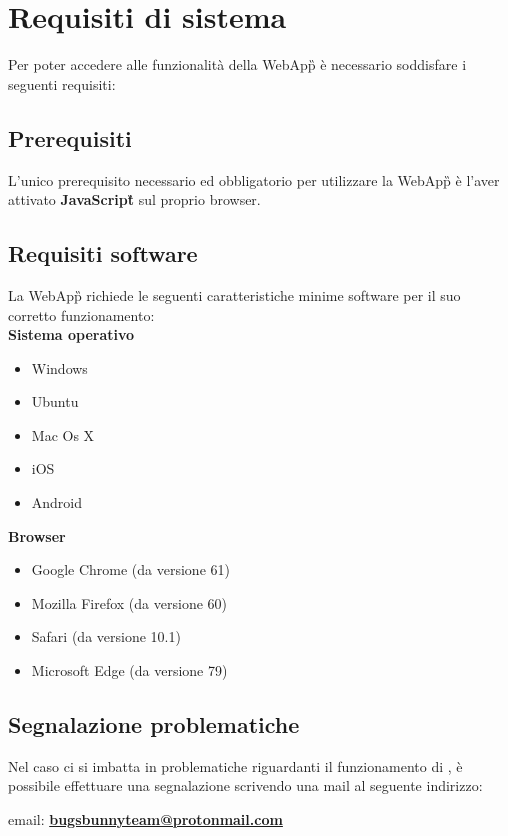 \section{Requisiti di sistema}
Per poter accedere alle funzionalità della WebApp\G{} è necessario soddisfare i seguenti requisiti:

\subsection{Prerequisiti}
L'unico prerequisito necessario ed obbligatorio per utilizzare la WebApp\G{} \platform{} è l'aver attivato \textbf{JavaScript}\G{} sul proprio browser.

\subsection{Requisiti software}
La WebApp\G{} \platform{} richiede le seguenti caratteristiche minime software per il suo corretto funzionamento:\\

\textbf{Sistema operativo}
\begin{itemize}
    \item Windows
    \item Ubuntu 
    \item Mac Os X
    \item iOS
    \item Android
\end{itemize}

\textbf{Browser}
\begin{itemize}
    \item Google Chrome (da versione 61)
    \item Mozilla Firefox (da versione 60)
    \item Safari (da versione 10.1)
    \item Microsoft Edge (da versione 79)
\end{itemize}

\subsection{Segnalazione problematiche}
Nel caso ci si imbatta in problematiche riguardanti il funzionamento di \platform, è possibile
effettuare una segnalazione scrivendo una mail al seguente indirizzo:\\


\begin{center}
email: \textbf{\href{mailto:bugsbunnyteam@protonmail.com}{bugsbunnyteam@protonmail.com} }
\end{center}
